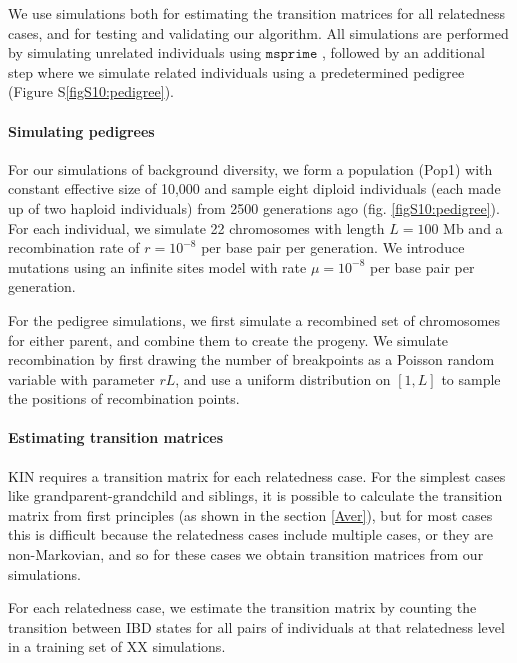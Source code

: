 \documentclass[12pt, letterpaper]{article}
\begin{document}
We use simulations both for estimating the transition matrices for all relatedness cases, and for testing and validating our algorithm. All simulations are performed by simulating unrelated individuals using $\texttt{msprime}$ \cite{kelleher_efficient_2016}, followed by an additional step where we simulate related individuals using a predetermined pedigree (Figure S\ref{figS10:pedigree}).

\paragraph{Simulating pedigrees}

For our simulations of background diversity, we form a population (Pop1) with constant effective size of 10,000 and sample eight diploid individuals (each made up of two haploid individuals) from 2500 generations ago (fig. \ref{figS10:pedigree}). For each individual, we simulate 22 chromosomes with length $L=100$ Mb and a recombination rate of $r=10^{-8}$ per base pair per generation. We introduce mutations using an infinite sites model with rate  $\mu= 10^{-8}$ per base pair per generation. 

For the pedigree simulations, we first simulate a recombined set of chromosomes for either parent, and combine them to create the progeny. We simulate recombination by first drawing the number of breakpoints as a  Poisson random variable with parameter $rL$, and use a uniform distribution on $[1, L]$ to sample the positions of recombination points. 

\paragraph{Estimating transition matrices}
KIN requires a transition matrix for each relatedness case. For the simplest cases like grandparent-grandchild and siblings, it is possible to calculate the transition matrix from first principles (as shown in the section \ref{Aver}), but for most cases this is difficult  because the relatedness cases include multiple cases, or they are non-Markovian, and so for these cases we obtain transition matrices from our simulations.

For each relatedness case, we estimate the transition matrix  by counting the transition between IBD states for all pairs of individuals at that relatedness level in a training set of XX simulations.
\end{document}
